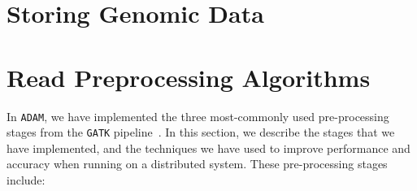 \documentclass[masters]{ucbthesis}
\begin{document}
\section{Storing Genomic Data}
\label{sec:schema-design}

\section{Read Preprocessing Algorithms}
\label{sec:read-preprocessing}

In \texttt{ADAM}, we have implemented the three most-commonly used pre-processing stages from the
\texttt{GATK} pipeline~\cite{depristo11}. In this section, we describe the stages that we have
implemented, and the techniques we have used to improve performance and accuracy when running on
a distributed system. These pre-processing stages include:
\end{document}
